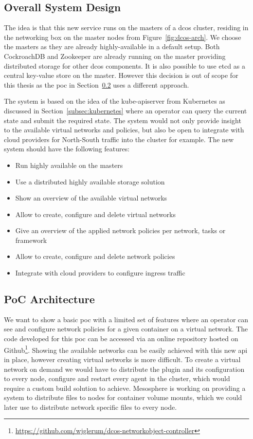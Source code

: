 \subsection{Overall System Design}
\label{subsec:system-design}
The idea is that this new service runs on the masters of a \gls{dcos} cluster, residing in the networking box on the master nodes from Figure~\ref{fig:dcos-arch}. We choose the masters as they are already highly-available in a default setup. Both CockroachDB\cite{cockroachdb} and Zookeeper\cite{zookeeper} are already running on the master providing distributed storage for other \gls{dcos} components. It is also possible to use etcd\cite{etcd} as a central key-value store on the master. However this decision is out of scope for this thesis as the \gls{poc} in Section~\ref{subsec:poc-architecture} uses a different approach.

The system is based on the idea of the kube-apiserver from Kubernetes as discussed in Section~\ref{subsec:kubernetes} where an operator can query the current state and submit the required state. The system would not only provide insight to the available virtual networks and policies, but also be open to integrate with cloud providers for North-South traffic into the cluster for example. The new system should have the following features: 
\begin{itemize}
    \item Run highly available on the masters
    \item Use a distributed highly available storage solution
    \item Show an overview of the available virtual networks
    \item Allow to create, configure and delete virtual networks
    \item Give an overview of the applied network policies per network, tasks or framework
    \item Allow to create, configure and delete network policies
    \item Integrate with cloud providers to configure ingress traffic
\end{itemize}

\subsection{PoC Architecture}
\label{subsec:poc-architecture}
We want to show a basic \gls{poc} with a limited set of features where an operator can see and configure network policies for a given container on a virtual network. The code developed for this \gls{poc} can be accessed via an online repository hosted on Github\footnote{\url{https://github.com/wjglerum/dcos-networkobject-controller}\label{ftn:repo}}. Showing the available networks can be easily achieved with this new \gls{api} in place, however creating virtual networks is more difficult. To create a virtual network on demand we would have to distribute the plugin and its configuration to every node, configure and restart every agent in the cluster, which would require a custom build solution to achieve. Mesosphere is working on providing a system to distribute files to nodes for container volume mounts, which we could later use to distribute network specific files to every node.

